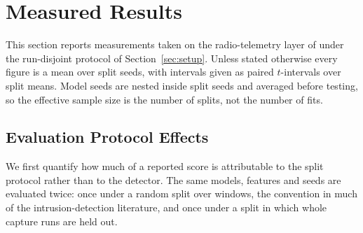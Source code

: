 %
%
%

\section{Measured Results}
\label{sec:measured}

This section reports measurements taken on the radio-telemetry layer of
\DA{} under the run-disjoint protocol of Section~\ref{sec:setup}. Unless
stated otherwise every figure is a mean over  split seeds,
with intervals given as paired $t$-intervals over split means. Model
seeds are nested inside split seeds and averaged before testing, so the
effective sample size is the number of splits, not the number of fits.

\subsection{Evaluation Protocol Effects}
\label{sec:measured:leakage}

We first quantify how much of a reported score is attributable to the
split protocol rather than to the detector. The same models, features and
seeds are evaluated twice: once under a random split over windows, the
convention in much of the intrusion-detection literature, and once under a
split in which whole capture runs are held out.

